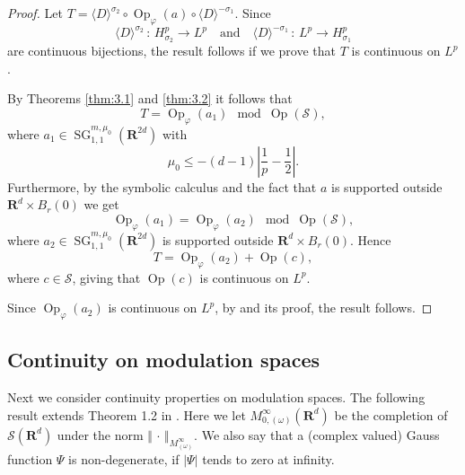\documentclass[12pt,a4paper,reqno]{amsart}
\numberwithin{equation}{section}
\numberwithin{thm}{section}
\theoremstyle{definition}
\theoremstyle{remark}
\begin{document}
\par

\begin{proof}
Let $T = {\langle D\rangle}^{\sigma _2}\circ {\operatorname{Op}}_\varphi(a) \circ {\langle D\rangle}^{-\sigma _1}$. Since
$$
{\langle D\rangle}^{\sigma _2}\, : \, H^p_{\sigma _2}\to L^p\quad \text{and}\quad
{\langle D\rangle}^{-\sigma _1}\, : \, L^p\to H^p_{\sigma _1}
$$
are continuous bijections, the result follows if we prove that $T$ is continuous
on $L^p$.

\par

By Theorems \ref{thm:3.1} and \ref{thm:3.2} it follows that
$$
T={\operatorname{Op}}_\varphi(a_1)\mod {\operatorname{Op}} ({{\mathscr S}} ),
$$
where $a_1\in {\operatorname{SG}} ^{m,\mu_0}_{1,1}({\mathbf R^{{2d}}})$ with
$$
\mu _0\le -(d-1)\left | \frac 1p-\frac 12 \right |.
$$
Furthermore, by the symbolic calculus and the fact that $a$ is supported
outside ${\mathbf R^{d}}\times B_r(0)$ we get
$$
{\operatorname{Op}}_\varphi(a_1) = {\operatorname{Op}}_\varphi(a_2)\mod {\operatorname{Op}} ({{\mathscr S}} ),
$$
where $a_2\in {\operatorname{SG}} ^{m,\mu_0}_{1,1}({\mathbf R^{{2d}}})$ is supported
outside ${\mathbf R^{d}}\times B_r(0)$. Hence
$$
T={\operatorname{Op}}_\varphi(a_2)+{\operatorname{Op}} (c),
$$
where $c\in {{\mathscr S}}$, giving that ${\operatorname{Op}} (c)$ is continuous on $L^p$.

\par

Since ${\operatorname{Op}}_\varphi(a_2)$ is continuous on $L^p$, by
\cite[Theorem 2.6]{CoRu} and its proof, the result follows.
\end{proof}

\par

\subsection{Continuity on modulation spaces}

\par

Next we consider continuity properties on modulation spaces. The following result
extends Theorem 1.2 in \cite{CorNicRod1}. Here we let $M^\infty _{0,(\omega )}
({\mathbf R^{d}})$ be the completion of $\mathscr S({\mathbf R^{d}})$ under the norm ${\Vert {\, \cdot \, }\Vert _{{M^\infty _{(\omega )}}}}$. We also say that a (complex valued) Gauss function
$\Psi$ is non-degenerate, if $|\Psi |$ tends to zero at infinity. 
\end{document}
